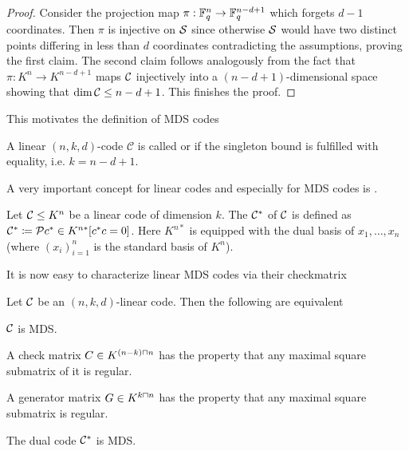 \begin{proof}
    Consider the projection map $\pi:\mathbb{F}_{q}^n\rightarrow\mathbb{F}_{q}^{n-d+1}$ which forgets $d-1$ coordinates.
    Then $\pi$ is injective on $\mathcal{S}$ since otherwise $\mathcal{S}$ would have two distinct points differing in less than $d$ coordinates contradicting the assumptions, proving the first claim.
    The second claim follows analogously from the fact that $\pi:K^n\to K^{n-d+1}$ maps $\mathcal{C}$ injectively into a $(n-d+1)$-dimensional space showing that $\dim{\mathcal{C}}\leq n-d+1$.
    This finishes the proof.
\end{proof}

This motivates the definition of MDS codes

\begin{definition}
    A linear $(n,k,d)$-code $\mathcal{C}$ is called  or  if the singleton bound is fulfilled with equality, i.e. $k=n-d+1$. 
\end{definition}

A very important concept for linear codes and especially for MDS codes is .

\begin{definition}\label{lincode-dual}
    Let $\mathcal{C}\leq K^n$ be a linear code of dimension $k$. The  $\mathcal{C}^{\ast}$ of $\mathcal{C}$ is defined as $\dual\cC\defeq\set{c^{\ast}\in K^{n\ast}}[c^{\ast}c=0]$. Here $K^{n\ast}$ is equipped with the dual basis of $x_1,\ldots,x_n$ (where ${(x_i)}_{i=1}^n$ is the standard basis of $K^n$).
\end{definition}

It is now easy to characterize linear MDS codes via their checkmatrix

\begin{lemma}\label{mdschar}
    Let $\mathcal{C}$ be an $(n,k,d)$-linear code. Then the following are equivalent
    \begin{statements}
            \item\label{mds} $\mathcal{C}$ is MDS.
            \item\label{mds-chkmtrx} A check matrix $C \in K^{(n-k)\setprod n}$ has the property that any maximal square submatrix of it is regular.
            \item\label{mds-gmtrx} A generator matrix $G \in K^{k\setprod n}$ has the property that any maximal square submatrix is regular.
            \item\label{mds-dual} The dual code $\mathcal{C}^{\ast}$ is MDS.
    \end{statements}
\end{lemma}


